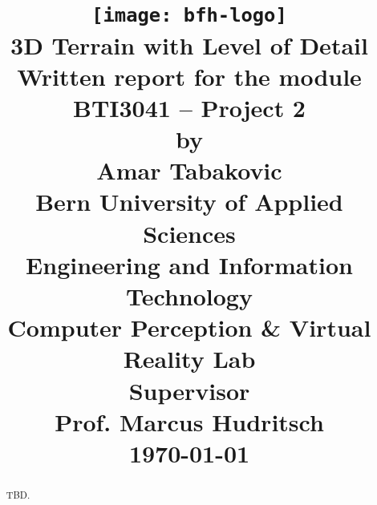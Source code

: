 \documentclass[11pt,a4paper]{report}
\begin{document}
\title{
\vspace{-80px}
\texttt{[image: bfh-logo]}\\
\vspace{80px}
\huge\textsf{\textbf{3D Terrain with Level of Detail}}\\
\vspace{50px}
\large{Written report for the module\\
BTI3041 -- Project 2\\ 
by\\}
\vspace{20px}
\Large{Amar Tabakovic\\}
\vspace{40px}
\large{
\textbf{Bern University of Applied Sciences}\\
  Engineering and Information Technology\\
  Computer Perception \& Virtual Reality Lab
\\
\vspace{20px}
\textbf{Supervisor}\\
Prof. Marcus Hudritsch}\\
\vspace{30px}
\today
}
\date{}
\maketitle

\begin{abstract}
TBD.
\end{abstract}
\tableofcontents







\end{document}

